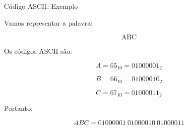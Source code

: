 \begin{frame}{Código ASCII: Exemplo}
    \small

    Vamos representar a palavra:

    \[
        \text{ABC}
    \]

    Os códigos ASCII são:

    \[
        A = 65_{10} = 01000001_2
    \]

    \[
        B = 66_{10} = 01000010_2
    \]

    \[
        C = 67_{10} = 01000011_2
    \]

    Portanto:

    \[
        \boxed{
        ABC =
        01000001\
        01000010\
        01000011
        }
    \]

\end{frame}
